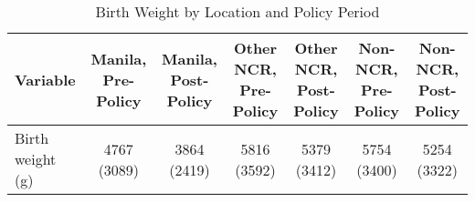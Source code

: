 \begin{table}[!h]
\centering
\caption{Birth Weight by Location and Policy Period}
\centering
\fontsize{8}{10}\selectfont
\begin{tabular}[t]{>{\raggedright\arraybackslash}m{3cm}cccccc}
\toprule
Variable & Manila, Pre-Policy & Manila, Post-Policy & Other NCR, Pre-Policy & Other NCR, Post-Policy & Non-NCR, Pre-Policy & Non-NCR, Post-Policy\\
\midrule
Birth weight (g) & 4767 (3089) & 3864 (2419) & 5816 (3592) & 5379 (3412) & 5754 (3400) & 5254 (3322)\\
\bottomrule
\end{tabular}
\end{table}
